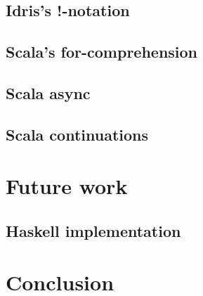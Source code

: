 \subsection{Idris's !-notation}

\subsection{Scala's for-comprehension}\label{Scala's for-comprehension}

\subsection{Scala async}

\subsection{Scala continuations}

\section{Future work}

\subsection{Haskell implementation}\label{Haskell implementation}

\section{Conclusion}



  
  


